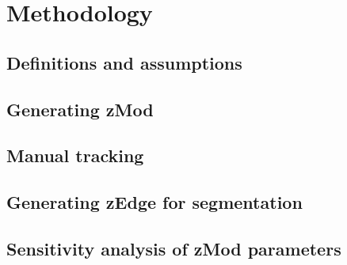 
\chapter{Methodology}

\ifpdf
    \graphicspath{{Chapter4/Figs/Raster/}{Chapter4/Figs/PDF/}{Chapter4/Figs/}}
\else
    \graphicspath{{Chapter4/Figs/Vector/}{Chapter4/Figs/}}
\fi

\section{Definitions and assumptions}


\section{Generating zMod}


\section{Manual tracking}


\section{Generating zEdge for segmentation}


\section{Sensitivity analysis of zMod parameters}
